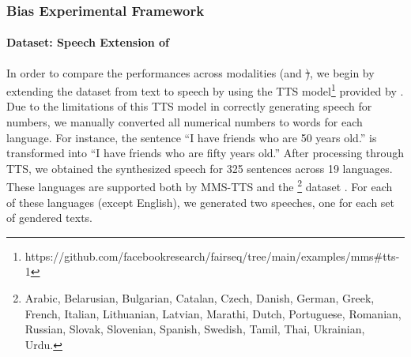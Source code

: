 \subsubsection{Bias Experimental Framework}
\label{subsec:biasexperimental}

 

\paragraph{Dataset: Speech Extension of \multilingualholisticbias} 
In order to compare the performances across modalities (\sst and \st), we begin by extending the \multilingualholisticbias dataset from text to speech by using the TTS model\footnote{https://github.com/facebookresearch/fairseq/tree/main/examples/mms\#tts-1} provided by \cite{mms}. Due to the limitations of this TTS model in correctly generating speech for numbers, we manually converted all numerical numbers to words for each language. For instance, the sentence “I have friends who are 50 years old.” is transformed into “I have friends who are fifty years old.” After processing through TTS, we obtained the synthesized speech for 325 sentences across 19 languages. These languages are supported both by MMS-TTS and the \multilingualholisticbias\footnote{Arabic, Belarusian, Bulgarian, Catalan, Czech, Danish, German, Greek, French, Italian, Lithuanian, Latvian, Marathi, Dutch, Portuguese, Romanian, Russian, Slovak, Slovenian, Spanish, Swedish, Tamil, Thai, Ukrainian, Urdu.} dataset  \citep{costa2023multilingual}. For each of these languages (except English), we generated two speeches, one for each set of gendered texts.

